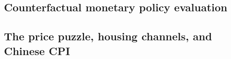 \documentclass[12pt, a4paper]{article}
\begin{document}
\subsection{Counterfactual monetary policy evaluation}


\subsection{The price puzzle, housing channels, and Chinese CPI}

\end{document}
